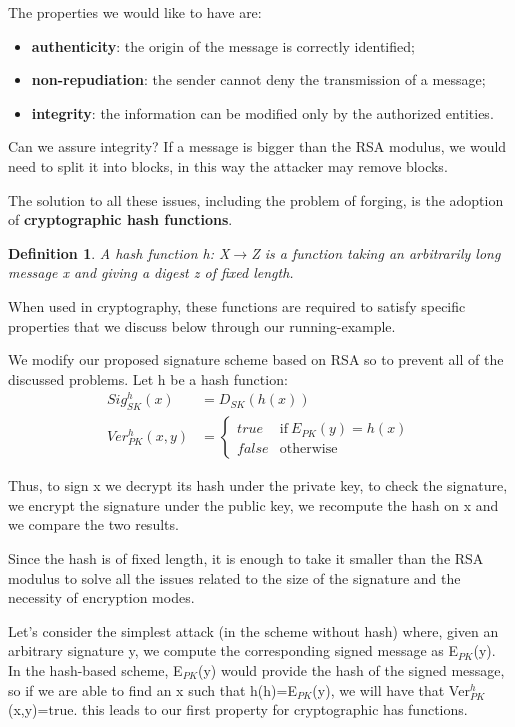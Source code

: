 \documentclass[a4paper, 12pt]{report}
\newtheorem{definition}{\textbf{Definition}}
\begin{document}
The properties we would like to have are:
\begin{itemize}
	\item \textbf{authenticity}: the origin of the message is correctly identified;
	\item \textbf{non-repudiation}: the sender cannot deny the transmission of a message;
	\item \textbf{integrity}: the information can be modified only by the authorized entities.
\end{itemize}

Can we assure integrity? If a message is bigger than the RSA modulus, we would need to split it into blocks, in this way the attacker may remove blocks.

The solution to all these issues, including the problem of forging, is the adoption of \textbf{cryptographic hash functions}.
\begin{definition}
	A hash function h: X$\rightarrow$Z is a function taking an arbitrarily long message x and giving a digest z of fixed length.
\end{definition} 

When used in cryptography, these functions are required to satisfy specific properties that we discuss below through our running-example.

We modify our proposed signature scheme based on RSA so to prevent all of the discussed problems. Let h be a hash function:
\begin{align*}
	Sig^h_{SK}(x) &= D_{SK}(h(x))\\
	Ver^h_{PK}(x,y) &= 
	\begin{cases}
	true & \text{if}\  E_{PK}(y)=h(x)\\
	false & \text{otherwise}
	\end{cases}
\end{align*}

Thus, to sign x we decrypt its hash under the private key, to check the signature, we encrypt the signature under the public key, we recompute the hash on x and we compare the two results.

Since the hash is of fixed length, it is enough to take it smaller than the RSA modulus to solve all the issues related to the size of the signature and the necessity of encryption modes.

Let's consider the simplest attack (in the scheme without hash) where, given an arbitrary signature y, we compute the corresponding signed message as E$_{PK}$(y). In the hash-based scheme, E$_{PK}$(y) would provide the hash of the signed message, so if we are able to find an x such that h(h)=E$_{PK}$(y), we will have that Ver$^h_{PK}$(x,y)=true. this leads to our first property for cryptographic has functions.
\end{document}
